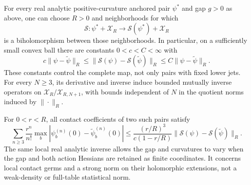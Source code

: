 \begin{theorem}
\label{thm:v59-analytic-contact-inverse}
For every real analytic positive-curvature anchored pair $\psi^*$ and
gap $g>0$ as above, one can choose $R>0$ and neighborhoods for which
\[
 \mathscr S:\psi^*+\mathscr X_R
                 \longrightarrow\mathscr S(\psi^*)+\mathscr X_R
\]
is a biholomorphism between those neighborhoods.  In particular, on a
sufficiently small convex ball there are constants $0<c<C<\infty$ with
\begin{equation}\label{eq:v59-nonlinear-bilip}
 c\|\psi-\widetilde\psi\|_R
 \le\|\mathscr S(\psi)-\mathscr S(\widetilde\psi)\|_R
 \le C\|\psi-\widetilde\psi\|_R.
\end{equation}
These constants control the complete map, not only pairs with fixed lower
jets.  For every $N\ge3$, its derivative and inverse induce bounded
mutually inverse operators on
$\mathscr X_R/\mathscr X_{R,N+1}$, with bounds independent of $N$
in the quotient norms induced by $\|\cdot\|_R$.

For $0<r<R$, all contact coefficients of two such pairs satisfy
\begin{equation}\label{eq:v59-all-coefficients}
 \sum_{n\ge3}\frac{r^n}{n!}
   \max_b|\psi_b^{(n)}(0)-\widetilde\psi_b^{(n)}(0)|
 \le \frac{(r/R)^3}{c(1-r/R)}
       \|\mathscr S(\psi)-\mathscr S(\widetilde\psi)\|_R.
\end{equation}
The same local real analytic inverse allows the gap and curvatures to
vary when the gap and both action Hessians are retained as finite
coordinates.  It concerns local contact germs and a strong norm on their
holomorphic extensions, not a weak-density or full-table statistical norm.
\end{theorem}

